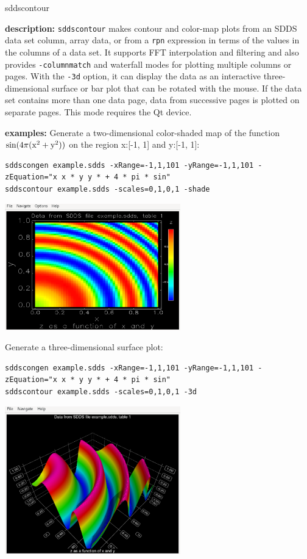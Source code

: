 \begin{sddsprog}{sddscontour}
  \item \textbf{description:}
  \verb|sddscontour| makes contour and color-map plots from an SDDS data set column, array data, or from a \verb|rpn| expression
  in terms of the values in the columns of a data set. It supports FFT interpolation and filtering and also provides
  \verb|-columnmatch| and waterfall modes for plotting multiple columns or pages. With the \verb|-3d| option, it
  can display the data as an interactive three-dimensional surface or bar plot that can be rotated with the mouse.
  If the data set contains more than one data page, data from successive pages is plotted on separate pages. This mode
  requires the Qt device.

  \item \textbf{examples:}
    Generate a two-dimensional color-shaded map of the function ${\rm sin(4\pi (x^2 + y^2))}$ on the region x:[-1, 1] and y:[-1, 1]:
    \begin{verbatim}
sddscongen example.sdds -xRange=-1,1,101 -yRange=-1,1,101 -zEquation="x x * y y * + 4 * pi * sin"
sddscontour example.sdds -scales=0,1,0,1 -shade
    \end{verbatim}
    \centerline{\includegraphics[width=3in]{2D-shade-plot.eps}}

    Generate a three-dimensional surface plot:
    \begin{verbatim}
sddscongen example.sdds -xRange=-1,1,101 -yRange=-1,1,101 -zEquation="x x * y y * + 4 * pi * sin"
sddscontour example.sdds -scales=0,1,0,1 -3d
    \end{verbatim}
    \centerline{\includegraphics[width=3in]{3D-surface-plot.eps}}


\end{sddsprog}
